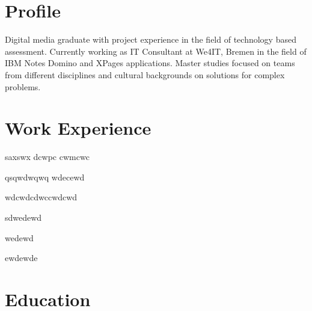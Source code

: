 \documentclass[]{deedy-resume-openfont}
\begin{document}
    
%
%
%
%
\vspace{-6pt}
\section{Profile}
Digital media graduate with project experience in the field of technology based assessment. Currently working as IT Consultant at We4IT, Bremen in the field of IBM Notes Domino and XPages applications. Master studies focused on teams from different disciplines and cultural backgrounds on solutions for complex problems.\\
%
%
\section{Work Experience}
\hfill {}
\begin{tightemize}
	\item saxswx dcwpc cwmcwc
	\item qsqwdwqwq wdecewd
	\item wdcwdcdwccwdcwd
\end{tightemize}
\sectionsep
{}\hfill {}
\begin{tightemize}
	\item sdwedewd
	\item wedewd
	\item ewdewde
\end{tightemize}
\sectionsep
%
%
\section{Education}
\raggedright

\hfill {}\\
    
\sectionsep
  
\end{document}
